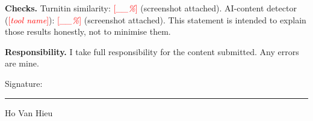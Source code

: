 \documentclass[11pt,a4paper]{article}
\newcommand{\todo}[1]{\textcolor{red}{[\textit{#1}]}}
\begin{document}
\medskip\noindent\textbf{Checks.} Turnitin similarity: \todo{\_\_\%} (screenshot attached). AI-content detector (\todo{tool name}): \todo{\_\_\%} (screenshot attached). This statement is intended to explain those results honestly, not to minimise them.

\medskip\noindent\textbf{Responsibility.} I take full responsibility for the content submitted. Any errors are mine.

\vfill
\noindent Signature: \rule{5cm}{0.4pt} \hfill Ho Van Hieu
\end{document}
